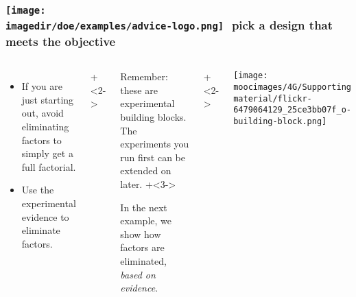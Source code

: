 \documentclass[handout,11pt,aspectratio=169,mathserif]{beamer}
\begin{document}
\begin{frame}\frametitle{\texttt{[image: \\imagedir/doe/examples/advice-logo.png]}\,\, pick a design that meets the objective}
	
	\begin{columns}[T]
		
			\begin{itemize}
				\item	If you are just starting out, avoid eliminating factors to simply get a full factorial.
				\item	Use the experimental evidence to eliminate factors.
			\end{itemize}
			
			
			\vspace{1cm}
			\onslide+<2->{
				\begin{itemize}
					\item	Remember: these are experimental building blocks. The experiments you run first can be extended on later.
					\vspace{0.5cm}
					\onslide+<3->{
						\item	In the next example, we show how factors are eliminated, {\color{myOrange}\emph{based on evidence}}.
					}
				\end{itemize}
			}
	
			\vspace{1cm}
			
			\onslide+<2->{
				\centerline{\texttt{[image: \\moocimages/4G/Supporting material/flickr-6479064129\_25ce3bb07f\_o-building-block.png]}}
		
			}
	\end{columns}
\end{frame}


\end{document}
